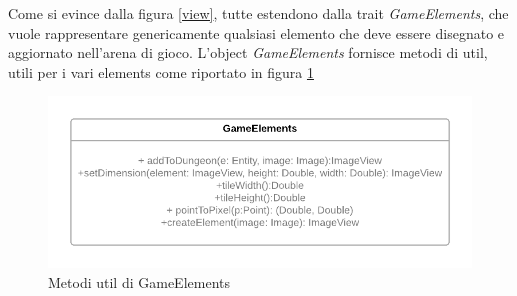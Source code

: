 Come si evince dalla figura \ref{view}, tutte estendono dalla trait \textit{GameElements}, che vuole rappresentare genericamente qualsiasi elemento che deve essere disegnato e aggiornato nell'arena di gioco. L'object \textit{GameElements} fornisce metodi di util, utili per i vari elements come riportato in figura \ref{gameElements}

\begin{figure}[H]
\centering
  \includegraphics[width=14cm]{res/gameElements_Diagram.png}
  \caption{Metodi util di GameElements}
  \label{gameElements}
\end{figure}

